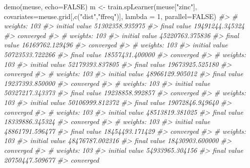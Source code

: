 \documentclass[
  graybox,natbib,nospthms]{svmono}
\newenvironment{Shaded}{\begin{snugshade}}{\end{snugshade}}
\newcommand{\AttributeTok}[1]{\textcolor[rgb]{0.61,0.61,0.61}{#1}}
\newcommand{\CommentTok}[1]{\textcolor[rgb]{0.37,0.37,0.37}{\textit{#1}}}
\newcommand{\ConstantTok}[1]{\textcolor[rgb]{0,0,0}{#1}}
\newcommand{\DecValTok}[1]{\textcolor[rgb]{0.06,0.06,0.06}{#1}}
\newcommand{\FunctionTok}[1]{\textcolor[rgb]{0,0,0}{#1}}
\newcommand{\NormalTok}[1]{#1}
\newcommand{\OtherTok}[1]{\textcolor[rgb]{0.37,0.37,0.37}{#1}}
\newcommand{\StringTok}[1]{\textcolor[rgb]{0.5,0.5,0.5}{#1}}
\begin{document}
\begin{Shaded}
\begin{Highlighting}[]
\FunctionTok{demo}\NormalTok{(meuse, }\AttributeTok{echo=}\ConstantTok{FALSE}\NormalTok{)}
\NormalTok{m }\OtherTok{\textless{}{-}} \FunctionTok{train.spLearner}\NormalTok{(meuse[}\StringTok{"zinc"}\NormalTok{], }\AttributeTok{covariates=}\NormalTok{meuse.grid[,}\FunctionTok{c}\NormalTok{(}\StringTok{"dist"}\NormalTok{,}\StringTok{"ffreq"}\NormalTok{)], }
                     \AttributeTok{lambda =} \DecValTok{1}\NormalTok{, }\AttributeTok{parallel=}\ConstantTok{FALSE}\NormalTok{)}
\CommentTok{\#\textgreater{} \# weights:  103}
\CommentTok{\#\textgreater{} initial  value 51302358.935975 }
\CommentTok{\#\textgreater{} final  value 19491244.345324 }
\CommentTok{\#\textgreater{} converged}
\CommentTok{\#\textgreater{} \# weights:  103}
\CommentTok{\#\textgreater{} initial  value 45220763.375836 }
\CommentTok{\#\textgreater{} final  value 16169762.129496 }
\CommentTok{\#\textgreater{} converged}
\CommentTok{\#\textgreater{} \# weights:  103}
\CommentTok{\#\textgreater{} initial  value 50723533.722266 }
\CommentTok{\#\textgreater{} final  value 18557431.400000 }
\CommentTok{\#\textgreater{} converged}
\CommentTok{\#\textgreater{} \# weights:  103}
\CommentTok{\#\textgreater{} initial  value 52179393.837805 }
\CommentTok{\#\textgreater{} final  value 19673925.525180 }
\CommentTok{\#\textgreater{} converged}
\CommentTok{\#\textgreater{} \# weights:  103}
\CommentTok{\#\textgreater{} initial  value 48966129.905012 }
\CommentTok{\#\textgreater{} final  value 19237393.850000 }
\CommentTok{\#\textgreater{} converged}
\CommentTok{\#\textgreater{} \# weights:  103}
\CommentTok{\#\textgreater{} initial  value 50327217.343373 }
\CommentTok{\#\textgreater{} final  value 19238858.992857 }
\CommentTok{\#\textgreater{} converged}
\CommentTok{\#\textgreater{} \# weights:  103}
\CommentTok{\#\textgreater{} initial  value 50106999.812372 }
\CommentTok{\#\textgreater{} final  value 19072846.949640 }
\CommentTok{\#\textgreater{} converged}
\CommentTok{\#\textgreater{} \# weights:  103}
\CommentTok{\#\textgreater{} initial  value 48513819.381025 }
\CommentTok{\#\textgreater{} final  value 18339886.345324 }
\CommentTok{\#\textgreater{} converged}
\CommentTok{\#\textgreater{} \# weights:  103}
\CommentTok{\#\textgreater{} initial  value 48861791.596477 }
\CommentTok{\#\textgreater{} final  value 18454493.171429 }
\CommentTok{\#\textgreater{} converged}
\CommentTok{\#\textgreater{} \# weights:  103}
\CommentTok{\#\textgreater{} initial  value 48476787.002316 }
\CommentTok{\#\textgreater{} final  value 18430903.600000 }
\CommentTok{\#\textgreater{} converged}
\CommentTok{\#\textgreater{} \# weights:  103}
\CommentTok{\#\textgreater{} initial  value 54933965.304156 }
\CommentTok{\#\textgreater{} final  value 20750447.509677 }
\CommentTok{\#\textgreater{} converged}
\end{Highlighting}
\end{Shaded}
\end{document}
